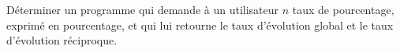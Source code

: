 
Déterminer un programme qui demande à un utilisateur $n$ taux de pourcentage, exprimé en pourcentage, et qui lui retourne le taux d'évolution global et le taux d'évolution réciproque. 